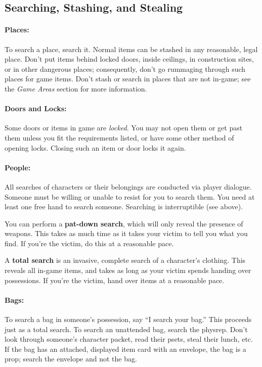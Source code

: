 \documentclass[sheet]{GL2020}
\begin{document}
\subsection{Searching, Stashing, and Stealing}

\paragraph{Places:} To search a place, search it.  Normal items can be stashed in any reasonable, legal place. Don't put items behind locked doors, inside ceilings, in construction sites, or in other dangerous places; consequently, don't go rummaging through such places for game items.  Don't stash or search in places that are not in-game; see the \emph{Game Areas} section for more information.

\paragraph{Doors and Locks:} Some doors or items in game are \emph{locked}. You may not open them or get past them unless you fit the requirements listed, or have some other method of opening locks. Closing such an item or door locks it again.

\paragraph{People:} All searches of characters or their belongings are conducted via player dialogue.  Someone must be willing or unable to resist for you to search them.  You need at least one free hand to search someone. Searching is interruptible (see above).

You can perform a {\bf pat-down search}, which will only reveal the presence of weapons. This takes as much time as it takes your victim to tell you what you find. If you're the victim, do this at a reasonable pace.

A {\bf total search} is an invasive, complete search of a character's clothing. This reveals all in-game items, and takes as long as your victim spends handing over possessions. If you're the victim, hand over items at a reasonable pace.

\paragraph{Bags:} To search a bag in someone's possession, say ``I search your bag.''  This proceeds just as a total search. To search an unattended bag, search the physrep. Don't look through someone's character packet, read their psets, steal their lunch, etc. If the bag has an attached, displayed item card with an envelope, the bag is a prop; search the envelope and not the bag.
\end{document}
